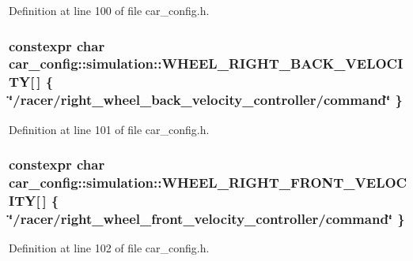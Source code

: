 Definition at line 100 of file car\+\_\+config.\+h.

\subsubsection[{\texorpdfstring{W\+H\+E\+E\+L\+\_\+\+R\+I\+G\+H\+T\+\_\+\+B\+A\+C\+K\+\_\+\+V\+E\+L\+O\+C\+I\+TY}{WHEEL_RIGHT_BACK_VELOCITY}}]{\setlength{\rightskip}{0pt plus 5cm}constexpr char car\+\_\+config\+::simulation\+::\+W\+H\+E\+E\+L\+\_\+\+R\+I\+G\+H\+T\+\_\+\+B\+A\+C\+K\+\_\+\+V\+E\+L\+O\+C\+I\+TY\mbox{[}$\,$\mbox{]} \{ \char`\"{}/racer/right\+\_\+wheel\+\_\+back\+\_\+velocity\+\_\+controller/command\char`\"{} \}}\hypertarget{namespacecar__config_1_1simulation_a824b4ee5d2b14eb92a017605678ada71}{}\label{namespacecar__config_1_1simulation_a824b4ee5d2b14eb92a017605678ada71}


Definition at line 101 of file car\+\_\+config.\+h.

\subsubsection[{\texorpdfstring{W\+H\+E\+E\+L\+\_\+\+R\+I\+G\+H\+T\+\_\+\+F\+R\+O\+N\+T\+\_\+\+V\+E\+L\+O\+C\+I\+TY}{WHEEL_RIGHT_FRONT_VELOCITY}}]{\setlength{\rightskip}{0pt plus 5cm}constexpr char car\+\_\+config\+::simulation\+::\+W\+H\+E\+E\+L\+\_\+\+R\+I\+G\+H\+T\+\_\+\+F\+R\+O\+N\+T\+\_\+\+V\+E\+L\+O\+C\+I\+TY\mbox{[}$\,$\mbox{]} \{ \char`\"{}/racer/right\+\_\+wheel\+\_\+front\+\_\+velocity\+\_\+controller/command\char`\"{} \}}\hypertarget{namespacecar__config_1_1simulation_ad0fb8a1c1f51bc790b995c81b07a04ea}{}\label{namespacecar__config_1_1simulation_ad0fb8a1c1f51bc790b995c81b07a04ea}


Definition at line 102 of file car\+\_\+config.\+h.

